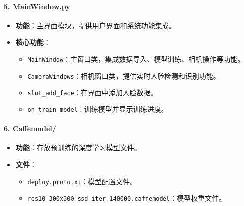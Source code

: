 \documentclass{article}
\begin{document}
\paragraph{5. MainWindow.py}
\begin{itemize}
    \item \textbf{功能}：主界面模块，提供用户界面和系统功能集成。
    \item \textbf{核心功能}：
    \begin{itemize}
        \item \texttt{MainWindow}：主窗口类，集成数据导入、模型训练、相机操作等功能。
        \item \texttt{CameraWindows}：相机窗口类，提供实时人脸检测和识别功能。
        \item \texttt{slot\_add\_face}：在界面中添加人脸数据。
        \item \texttt{on\_train\_model}：训练模型并显示训练进度。
    \end{itemize}
\end{itemize}

\paragraph{6. Caffemodel/}
\begin{itemize}
    \item \textbf{功能}：存放预训练的深度学习模型文件。
    \item \textbf{文件}：
    \begin{itemize}
        \item \texttt{deploy.prototxt}：模型配置文件。
        \item \texttt{res10\_300x300\_ssd\_iter\_140000.caffemodel}：模型权重文件。
    \end{itemize}
\end{itemize}
\end{document}
